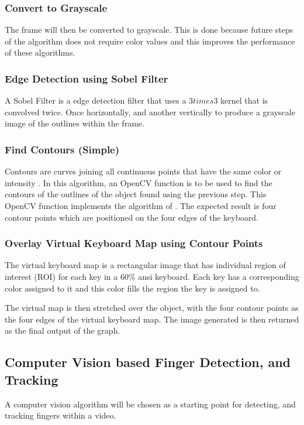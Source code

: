 \documentclass{report}
\begin{document}
\subsubsection{Convert to Grayscale}
The frame will then be converted to grayscale. This is done because future steps
of the algorithm does not require color values and this improves the performance
of these algorithms.

\subsubsection{Edge Detection using Sobel Filter}
A Sobel Filter is a edge detection filter that uses a 3$times$3 kernel that is
convolved twice. Once horizontally, and another vertically to produce a
grayscale image of the outlines within the frame.

\subsubsection{Find Contours (Simple)}
Contours are curves joining all continuous points that have the same color or
intensity \parencite{opencv-contours}. In this algorithm, an OpenCV function is
to be used to find the contours of the outlines of the object found using the
previous step. This OpenCV function implements the algorithm of \cite{contours}.
The expected result is four contour points which are positioned on the four
edges of the keyboard.

\subsubsection{Overlay Virtual Keyboard Map using Contour Points}
The virtual keyboard map is a rectangular image that has individual region of
interest (ROI) for each key in a 60\% \ac{ansi} keyboard. Each key has a
corresponding color assigned to it and this color fills the region the key is
assigned to.

The virtual map is then stretched over the object, with the four contour points
as the four edges of the virtual keyboard map. The image generated is then
returned as the final output of the graph.

\subsection{Computer Vision based Finger Detection, and Tracking}
\label{section:metho-algo-finger}

A computer vision algorithm will be chosen as a starting point for detecting,
and tracking fingers within a video.
\end{document}
